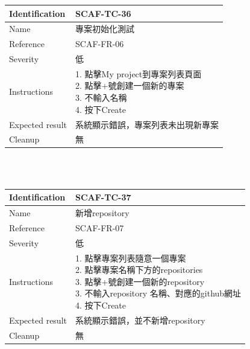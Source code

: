 \documentclass{report}
\begin{document}
\begin{tabularx}{\textwidth}{
  |p{}%
  |p{}|%
  }
  \hline
  \centering Identification &  SCAF-TC-36 \\
  \hline
  \centering Name & 專案初始化測試 \\
  \hline
  \centering Reference & SCAF-FR-06 \\
  \hline
  \centering Severity & 低 \\
  \hline
  \centering Instructions & 
  \makecell[l]{
    1. 點擊My project到專案列表頁面  \\
    2. 點擊+號創建一個新的專案  \\
    3. 不輸入名稱  \\
    4. 按下Create
  }\\
  \hline
  \centering Expected result & 系統顯示錯誤，專案列表未出現新專案 \\
  \hline
  \centering Cleanup & 無 \\
  \hline
\end{tabularx}
\\
\newline
\\
\begin{tabularx}{\textwidth}{
  |p{}%
  |p{}|%
  }
  \hline
  \centering Identification &  SCAF-TC-37 \\
  \hline
  \centering Name & 新增repository \\
  \hline
  \centering Reference & SCAF-FR-07 \\
  \hline
  \centering Severity & 低 \\
  \hline
  \centering Instructions & 
  \makecell[l]{
    1. 點擊專案列表隨意一個專案 \\
    2. 點擊專案名稱下方的repositories \\
    3. 點擊+號創建一個新的repository \\
    3. 不輸入repository 名稱、對應的github網址  \\
    4. 按下Create
  }\\
  \hline
  \centering Expected result & 系統顯示錯誤，並不新增repository \\
  \hline
  \centering Cleanup & 無 \\
  \hline
\end{tabularx}
\\
\newline
\\
\end{document}
